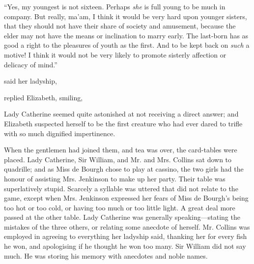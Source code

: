 

“Yes, my youngest is not sixteen. Perhaps {\em she} is full young to be much in company. But really, ma'am, I think it would be very hard upon younger sisters, that they should not have their share of society and amusement, because the elder may not have the means or inclination to marry early. The last-born has as good a right to the pleasures of youth as the first. And to be kept back on {\em such} a motive! I think it would not be very likely to promote sisterly affection or delicacy of mind.”

 said her ladyship, 

 replied Elizabeth, smiling, 

Lady Catherine seemed quite astonished at not receiving a direct answer; and Elizabeth suspected herself to be the first creature who had ever dared to trifle with so much dignified impertinence.



When the gentlemen had joined them, and tea was over, the card-tables were placed. Lady Catherine, Sir William, and Mr. and Mrs. Collins sat down to quadrille; and as Miss de Bourgh chose to play at cassino, the two girls had the honour of assisting Mrs. Jenkinson to make up her party. Their table was superlatively stupid. Scarcely a syllable was uttered that did not relate to the game, except when Mrs. Jenkinson expressed her fears of Miss de Bourgh's being too hot or too cold, or having too much or too little light. A great deal more passed at the other table. Lady Catherine was generally speaking---stating the mistakes of the three others, or relating some anecdote of herself. Mr. Collins was employed in agreeing to everything her ladyship said, thanking her for every fish he won, and apologising if he thought he won too many. Sir William did not say much. He was storing his memory with anecdotes and noble names.

